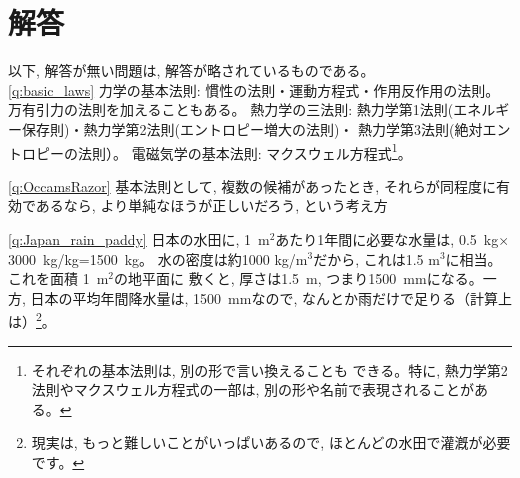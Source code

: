 \section*{解答}

以下, 解答が無い問題は, 解答が略されているものである。\\

\ref{q:basic_laws} 
力学の基本法則: 慣性の法則・運動方程式・作用反作用の法則。万有引力の法則を加えることもある。
熱力学の三法則: 熱力学第1法則(エネルギー保存則)・熱力学第2法則(エントロピー増大の法則)・
熱力学第3法則(絶対エントロピーの法則）。
電磁気学の基本法則: マクスウェル方程式\footnote{それぞれの基本法則は, 別の形で言い換えることも
できる。特に, 熱力学第2法則やマクスウェル方程式の一部は, 別の形や名前で表現されることがある。}。
\vspace{0.2cm}


\ref{q:OccamsRazor} 
基本法則として, 複数の候補があったとき, それらが同程度に有効であるなら, 
より単純なほうが正しいだろう, という考え方
\vspace{0.2cm}



\ref{q:Japan_rain_paddy} 
日本の水田に, 1~m$^2$あたり1年間に必要な水量は, 0.5~kg$\times$3000~kg/kg=1500~kg。
水の密度は約1000 kg/m$^3$だから, これは1.5 m$^3$に相当。これを面積 1~m$^2$の地平面に
敷くと, 厚さは1.5~m, つまり1500~mmになる。一方, 日本の平均年間降水量は, 1500~mmなので, 
なんとか雨だけで足りる（計算上は）\footnote{現実は, もっと難しいことがいっぱいあるので, 
ほとんどの水田で灌漑が必要です。}。
\vspace{0.2cm}

